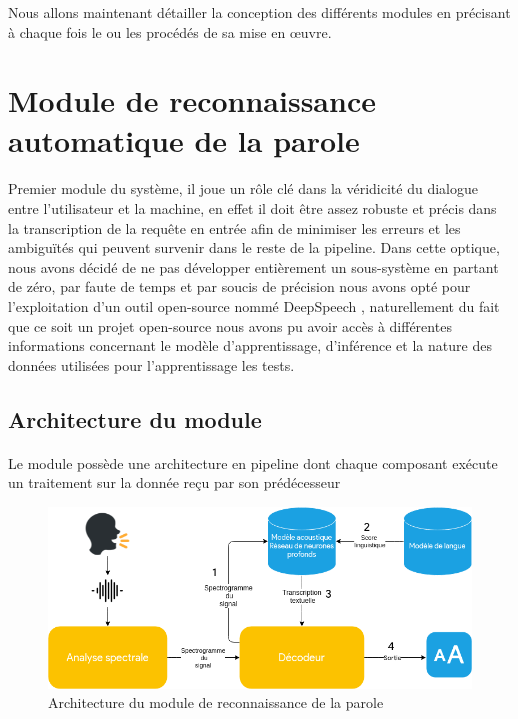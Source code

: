 	\par
	Nous allons maintenant détailler la conception des différents modules en précisant à chaque fois le ou les procédés de sa mise en œuvre. 
\section{Module de reconnaissance automatique de la parole}
\paragraph{}
Premier module du système, il joue un rôle clé dans la véridicité du dialogue entre l'utilisateur et la machine, en effet il doit être assez robuste et précis dans la transcription de la requête en entrée afin de minimiser les erreurs et les ambiguïtés qui peuvent survenir dans le reste de la pipeline. Dans cette optique, nous avons décidé de ne pas développer entièrement un sous-système en partant de zéro, par faute de temps et par soucis de précision nous avons opté pour l'exploitation d'un outil open-source nommé DeepSpeech \cite{deepspeech_paper}, naturellement du fait que ce soit un projet open-source nous avons pu avoir accès à différentes informations concernant le modèle d'apprentissage, d'inférence et la nature des données utilisées pour l'apprentissage les tests.
	\subsection{Architecture du module}
	\paragraph{}
	Le module possède une architecture en pipeline dont chaque composant exécute un traitement sur la donnée reçu par son prédécesseur
	\begin{figure}[H] 
		\centering
		\includegraphics[width=0.88\linewidth]{images/Conception/ASR/schema.png}
		\caption{Architecture du module de reconnaissance de la parole}
	\end{figure}
